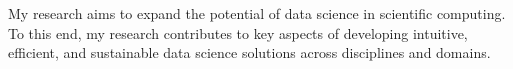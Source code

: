 \documentclass[11pt, a4paper]{andre-bewerbung}
\begin{document}


\makecvheader[C]
\makecvfooter{}

\vspace{0.5cm}


\begin{cvtext}
    My research aims to expand the potential of data science in scientific computing. To this end, my research contributes to key aspects of developing intuitive, efficient, and sustainable data science solutions across disciplines and domains.
\end{cvtext}



\vspace{-5mm}
















\end{document}
